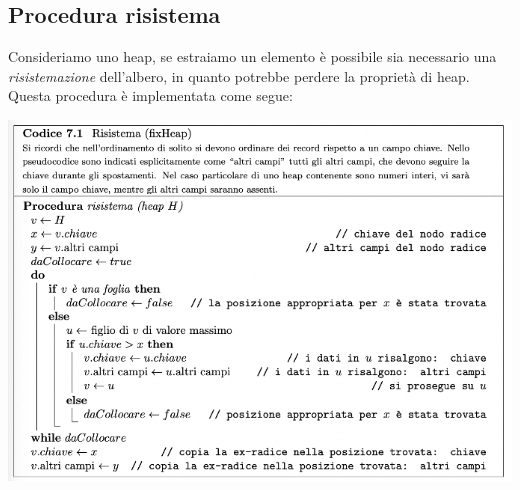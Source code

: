 \documentclass[11pt, oneside]{article}   	%
\begin{document}
\subsection*{Procedura risistema}
Consideriamo uno heap, se estraiamo un elemento è possibile sia necessario una \emph{risistemazione} dell'albero, in quanto potrebbe perdere la proprietà di heap. Questa procedura è implementata come segue:
\begin{center}
\includegraphics[scale=0.9]{risistemaheap}
\end{center}
\end{document}
